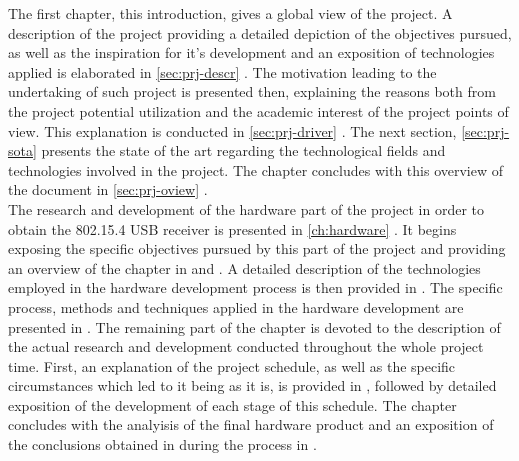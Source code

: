 		The first chapter, this introduction, gives a global view of the project. A description of the project providing a detailed depiction of the objectives pursued, as well as the inspiration for it's development and an exposition of technologies applied is elaborated in \autoref{sec:prj-descr} \emph{}. The motivation leading to the undertaking of such project is presented then, explaining the reasons both from the project potential utilization and the academic interest of the project points of view. This explanation is conducted in \autoref{sec:prj-driver} \emph{}. The next section, \autoref{sec:prj-sota} presents the state of the art regarding the technological fields and technologies involved in the project. The chapter concludes with this overview of the document in \autoref{sec:prj-oview} \emph{}.\\
		
		The research and development of the hardware part of the project in order to obtain the 802.15.4 USB receiver is presented in \autoref{ch:hardware} \emph{}. It begins exposing the specific objectives pursued by this part of the project and providing an overview of the chapter in  and . A detailed description of the technologies employed in the hardware development process is then provided in . The specific process, methods and techniques applied in the hardware development are presented in . The remaining part of the chapter is devoted to the description of the actual research and development conducted throughout the whole project time. First, an explanation of the project schedule, as well as the specific circumstances which led to it being as it is, is provided in , followed by detailed exposition of the development of each stage of this schedule. The chapter concludes with the analyisis of the final hardware product and an exposition of the conclusions obtained in during the process in .\\

